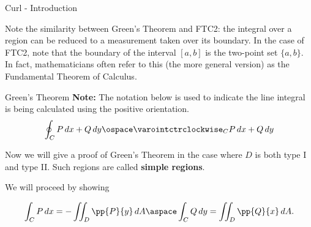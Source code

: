\documentclass[11pt,english,
handout
]{beamer}
\begin{document}
\begin{frame}[t]{Curl - Introduction}
\small
{}

\lspace
Note the similarity between Green's Theorem and FTC2: the integral over a region can be reduced to a measurement taken over its boundary. In the case of FTC2, note that the boundary of the interval $[a,b]$ is the two-point set $\{a,b\}$. In fact, mathematicians often refer to this (the more general version) as the Fundamental Theorem of Calculus.
\end{frame}












\begin{frame}[t]{Green's Theorem}
\small
\textbf{Note:} The notation below is used to indicate the line integral is being calculated using the positive orientation.
\[
\oint_CP\,dx+Q\,dy\ospace \varointctrclockwise_C P\,dx +Q\,dy
\]\pause 


Now we will give a proof of Green's Theorem in the case where $D$ is both type I and type II. Such regions are called \textbf{simple regions}.\pause 

\lspace
\begin{proofs}
We will proceed by showing 

\[
\int_CP\,dx=-\iint_D\pp{P}{y}\,dA\aspace \int_CQ\,dy=\iint_D\pp{Q}{x}\,dA.
\]
\end{proofs}
\end{frame}
\end{document}
